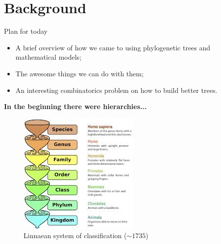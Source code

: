 \section*{Background}
\begin{frame}[t,plain]
\titlepage
\end{frame}
\begin{frame}{Plan for today}
 \begin{itemize}
  \item A brief overview of how we came to using phylogenetic trees and mathematical models;
  \item The awesome things we can do with them;
  \item An interesting combinatorics problem on how to build better trees.
 \end{itemize}
\end{frame}
\begin{frame}[t]{\textbf{In the beginning there were hierarchies...}}
 \begin{figure}[!h]
\begin{center}
\includegraphics[scale=.55]{FIGURES/linnaeus_system.jpg}
\caption{Linnaean system of classification ($\sim 1735$)}
\end{center}
\end{figure}
\end{frame}

